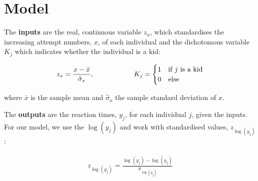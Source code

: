 \documentclass[11pt,a4paper]{article}
\begin{document}
\section*{Model}
The \textbf{inputs} are the real, continuous variable $z_x$, which standardises the increasing attempt numbers, $x$, of each individual and the dichotomous variable $K_j$ which indicates whether the individual is a kid:
\begin{linenomath}
\begin{align}
z_x = \frac{x - \bar{x}}{\hat{\sigma}_x}, \hspace*{2cm}
K_j =
\begin{cases}
\displaystyle
1 & \text{if } j \text{ is a kid}\\ %
\displaystyle
0 & \text{else}
\end{cases}
\end{align}
\end{linenomath}
where $\bar{x}$ is the sample mean and $\hat{\sigma}_x$ the sample standard deviation of $x$.

The \textbf{outputs} are the reaction times, $y_j$, for each individual $j$, given the inputs. For our model, we use the $\log(y_j)$ and work with standardised values, $z_{\log(y_j)}$:
\begin{linenomath}
\begin{align}\label{eq:stand_y}
z_{\log(y_j)} = \frac{\log(y_j) - \overline{\log(y_j)}}{\hat{\sigma}_{\log(y_j)}}
\end{align}
\end{linenomath}
\end{document}
